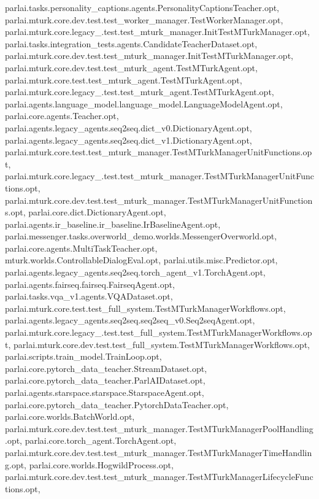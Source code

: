 parlai.\+tasks.\+personality\+\_\+captions.\+agents.\+Personality\+Captions\+Teacher.\+opt, parlai.\+mturk.\+core.\+dev.\+test.\+test\+\_\+worker\+\_\+manager.\+Test\+Worker\+Manager.\+opt, parlai.\+mturk.\+core.\+legacy\+\_.\+test.\+test\+\_\+mturk\+\_\+manager.\+Init\+Test\+M\+Turk\+Manager.\+opt, parlai.\+tasks.\+integration\+\_\+tests.\+agents.\+Candidate\+Teacher\+Dataset.\+opt, parlai.\+mturk.\+core.\+dev.\+test.\+test\+\_\+mturk\+\_\+manager.\+Init\+Test\+M\+Turk\+Manager.\+opt, parlai.\+mturk.\+core.\+dev.\+test.\+test\+\_\+mturk\+\_\+agent.\+Test\+M\+Turk\+Agent.\+opt, parlai.\+mturk.\+core.\+test.\+test\+\_\+mturk\+\_\+agent.\+Test\+M\+Turk\+Agent.\+opt, parlai.\+mturk.\+core.\+legacy\+\_.\+test.\+test\+\_\+mturk\+\_\+agent.\+Test\+M\+Turk\+Agent.\+opt, parlai.\+agents.\+language\+\_\+model.\+language\+\_\+model.\+Language\+Model\+Agent.\+opt, parlai.\+core.\+agents.\+Teacher.\+opt, parlai.\+agents.\+legacy\+\_\+agents.\+seq2seq.\+dict\+\_\+v0.\+Dictionary\+Agent.\+opt, parlai.\+agents.\+legacy\+\_\+agents.\+seq2seq.\+dict\+\_\+v1.\+Dictionary\+Agent.\+opt, parlai.\+mturk.\+core.\+test.\+test\+\_\+mturk\+\_\+manager.\+Test\+M\+Turk\+Manager\+Unit\+Functions.\+opt, parlai.\+mturk.\+core.\+legacy\+\_.\+test.\+test\+\_\+mturk\+\_\+manager.\+Test\+M\+Turk\+Manager\+Unit\+Functions.\+opt, parlai.\+mturk.\+core.\+dev.\+test.\+test\+\_\+mturk\+\_\+manager.\+Test\+M\+Turk\+Manager\+Unit\+Functions.\+opt, parlai.\+core.\+dict.\+Dictionary\+Agent.\+opt, parlai.\+agents.\+ir\+\_\+baseline.\+ir\+\_\+baseline.\+Ir\+Baseline\+Agent.\+opt, parlai.\+messenger.\+tasks.\+overworld\+\_\+demo.\+worlds.\+Messenger\+Overworld.\+opt, parlai.\+core.\+agents.\+Multi\+Task\+Teacher.\+opt, mturk.\+worlds.\+Controllable\+Dialog\+Eval.\+opt, parlai.\+utils.\+misc.\+Predictor.\+opt, parlai.\+agents.\+legacy\+\_\+agents.\+seq2seq.\+torch\+\_\+agent\+\_\+v1.\+Torch\+Agent.\+opt, parlai.\+agents.\+fairseq.\+fairseq.\+Fairseq\+Agent.\+opt, parlai.\+tasks.\+vqa\+\_\+v1.\+agents.\+V\+Q\+A\+Dataset.\+opt, parlai.\+mturk.\+core.\+test.\+test\+\_\+full\+\_\+system.\+Test\+M\+Turk\+Manager\+Workflows.\+opt, parlai.\+agents.\+legacy\+\_\+agents.\+seq2seq.\+seq2seq\+\_\+v0.\+Seq2seq\+Agent.\+opt, parlai.\+mturk.\+core.\+legacy\+\_.\+test.\+test\+\_\+full\+\_\+system.\+Test\+M\+Turk\+Manager\+Workflows.\+opt, parlai.\+mturk.\+core.\+dev.\+test.\+test\+\_\+full\+\_\+system.\+Test\+M\+Turk\+Manager\+Workflows.\+opt, parlai.\+scripts.\+train\+\_\+model.\+Train\+Loop.\+opt, parlai.\+core.\+pytorch\+\_\+data\+\_\+teacher.\+Stream\+Dataset.\+opt, parlai.\+core.\+pytorch\+\_\+data\+\_\+teacher.\+Parl\+A\+I\+Dataset.\+opt, parlai.\+agents.\+starspace.\+starspace.\+Starspace\+Agent.\+opt, parlai.\+core.\+pytorch\+\_\+data\+\_\+teacher.\+Pytorch\+Data\+Teacher.\+opt, parlai.\+core.\+worlds.\+Batch\+World.\+opt, parlai.\+mturk.\+core.\+dev.\+test.\+test\+\_\+mturk\+\_\+manager.\+Test\+M\+Turk\+Manager\+Pool\+Handling.\+opt, parlai.\+core.\+torch\+\_\+agent.\+Torch\+Agent.\+opt, parlai.\+mturk.\+core.\+dev.\+test.\+test\+\_\+mturk\+\_\+manager.\+Test\+M\+Turk\+Manager\+Time\+Handling.\+opt, parlai.\+core.\+worlds.\+Hogwild\+Process.\+opt, parlai.\+mturk.\+core.\+dev.\+test.\+test\+\_\+mturk\+\_\+manager.\+Test\+M\+Turk\+Manager\+Lifecycle\+Functions.\+opt, 